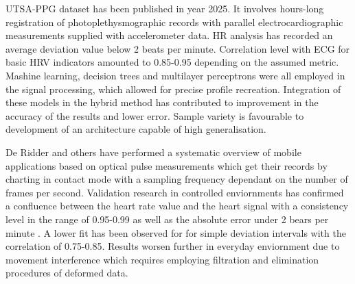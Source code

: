 \documentclass[journal]{IEEEtran}
\begin{document}
{UTSA-PPG dataset \cite{18} has been published in year 2025. It involves hours-long registration of photoplethysmographic records with parallel electrocardiographic measurements supplied with accelerometer data. HR analysis has recorded an average deviation value below 2 beats per minute. Correlation level with ECG for basic HRV indicators amounted to 0.85-0.95 depending on the assumed metric. Mashine learning, decision trees and multilayer perceptrons were all employed in the signal processing, which allowed for precise profile recreation. Integration of these models in the hybrid method has contributed to improvement in the accuracy of the results and lower error. Sample variety is favourable to development of an architecture capable of high generalisation.

\newpage
De Ridder and others \cite{19} have performed a systematic overview of mobile applications based on optical pulse measurements which get their records by charting in contact mode with a sampling frequency dependant on the number of frames per second. Validation research in controlled enviornments has confirmed a confluence between the heart rate value and the heart signal with a consistency level in the range of 0.95-0.99 as well as the absolute error under 2 bears per minute \cite{20}. A lower fit has been observed for for simple deviation intervals with the correlation of 0.75-0.85. Results worsen further in everyday enviornment due to movement interference which requires employing filtration and elimination procedures of deformed data.


}
\end{document}
